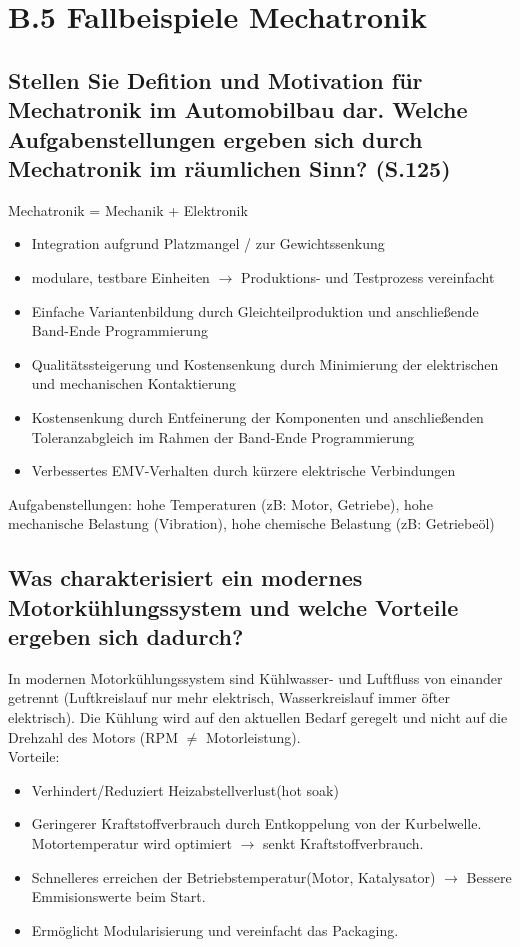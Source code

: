 \section*{B.5 Fallbeispiele Mechatronik}

\subsection{Stellen Sie Defition und Motivation f\"ur Mechatronik im Automobilbau dar. Welche Aufgabenstellungen ergeben sich durch Mechatronik im r\"aumlichen Sinn? (S.125)}
Mechatronik = Mechanik + Elektronik
\begin{itemize}
\item Integration aufgrund Platzmangel / zur Gewichtssenkung
\item modulare, testbare Einheiten $\rightarrow$ Produktions- und Testprozess vereinfacht
\item Einfache Variantenbildung durch Gleichteilproduktion und anschließende Band-Ende Programmierung
\item Qualitätssteigerung und Kostensenkung durch Minimierung der elektrischen und mechanischen Kontaktierung
\item Kostensenkung durch Entfeinerung der Komponenten und anschließenden Toleranzabgleich im Rahmen der 
Band-Ende Programmierung
\item Verbessertes EMV-Verhalten durch kürzere elektrische Verbindungen
\end{itemize}
Aufgabenstellungen: hohe Temperaturen (zB: Motor, Getriebe), hohe mechanische Belastung (Vibration), hohe 
chemische Belastung (zB: Getriebeöl)

\subsection{Was charakterisiert ein modernes Motorkühlungssystem und welche Vorteile ergeben sich dadurch?}
In modernen Motorkühlungssystem sind Kühlwasser- und Luftfluss von
einander getrennt (Luftkreislauf nur mehr elektrisch, Wasserkreislauf
immer öfter elektrisch). Die Kühlung wird auf den aktuellen Bedarf
geregelt und nicht auf die Drehzahl des Motors (RPM $\neq$ Motorleistung).\\
Vorteile:
\begin{itemize}
\item Verhindert/Reduziert Heizabstellverlust(hot soak)
\item Geringerer Kraftstoffverbrauch durch Entkoppelung von der
  Kurbelwelle. Motortemperatur wird optimiert $\rightarrow$ senkt Kraftstoffverbrauch.
\item Schnelleres erreichen der Betriebstemperatur(Motor, Katalysator)
  $\rightarrow$ Bessere Emmisionswerte beim Start.
\item Ermöglicht Modularisierung und vereinfacht das Packaging.
\end{itemize}

